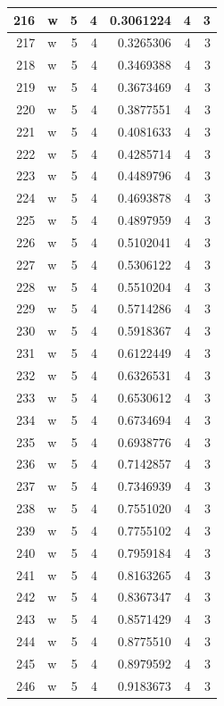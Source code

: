 \documentclass[
  letterpaper,
  DIV=11,
  numbers=noendperiod]{scrreprt}
\begin{document}
\begin{table}
\begin{tabular}[t]{r|l|r|r|r|r|r}
\hline
216 & w & 5 & 4 & 0.3061224 & 4 & 3\\
\hline
217 & w & 5 & 4 & 0.3265306 & 4 & 3\\
\hline
218 & w & 5 & 4 & 0.3469388 & 4 & 3\\
\hline
219 & w & 5 & 4 & 0.3673469 & 4 & 3\\
\hline
220 & w & 5 & 4 & 0.3877551 & 4 & 3\\
\hline
221 & w & 5 & 4 & 0.4081633 & 4 & 3\\
\hline
222 & w & 5 & 4 & 0.4285714 & 4 & 3\\
\hline
223 & w & 5 & 4 & 0.4489796 & 4 & 3\\
\hline
224 & w & 5 & 4 & 0.4693878 & 4 & 3\\
\hline
225 & w & 5 & 4 & 0.4897959 & 4 & 3\\
\hline
226 & w & 5 & 4 & 0.5102041 & 4 & 3\\
\hline
227 & w & 5 & 4 & 0.5306122 & 4 & 3\\
\hline
228 & w & 5 & 4 & 0.5510204 & 4 & 3\\
\hline
229 & w & 5 & 4 & 0.5714286 & 4 & 3\\
\hline
230 & w & 5 & 4 & 0.5918367 & 4 & 3\\
\hline
231 & w & 5 & 4 & 0.6122449 & 4 & 3\\
\hline
232 & w & 5 & 4 & 0.6326531 & 4 & 3\\
\hline
233 & w & 5 & 4 & 0.6530612 & 4 & 3\\
\hline
234 & w & 5 & 4 & 0.6734694 & 4 & 3\\
\hline
235 & w & 5 & 4 & 0.6938776 & 4 & 3\\
\hline
236 & w & 5 & 4 & 0.7142857 & 4 & 3\\
\hline
237 & w & 5 & 4 & 0.7346939 & 4 & 3\\
\hline
238 & w & 5 & 4 & 0.7551020 & 4 & 3\\
\hline
239 & w & 5 & 4 & 0.7755102 & 4 & 3\\
\hline
240 & w & 5 & 4 & 0.7959184 & 4 & 3\\
\hline
241 & w & 5 & 4 & 0.8163265 & 4 & 3\\
\hline
242 & w & 5 & 4 & 0.8367347 & 4 & 3\\
\hline
243 & w & 5 & 4 & 0.8571429 & 4 & 3\\
\hline
244 & w & 5 & 4 & 0.8775510 & 4 & 3\\
\hline
245 & w & 5 & 4 & 0.8979592 & 4 & 3\\
\hline
246 & w & 5 & 4 & 0.9183673 & 4 & 3\\

\end{tabular}
\end{table}
\end{document}
